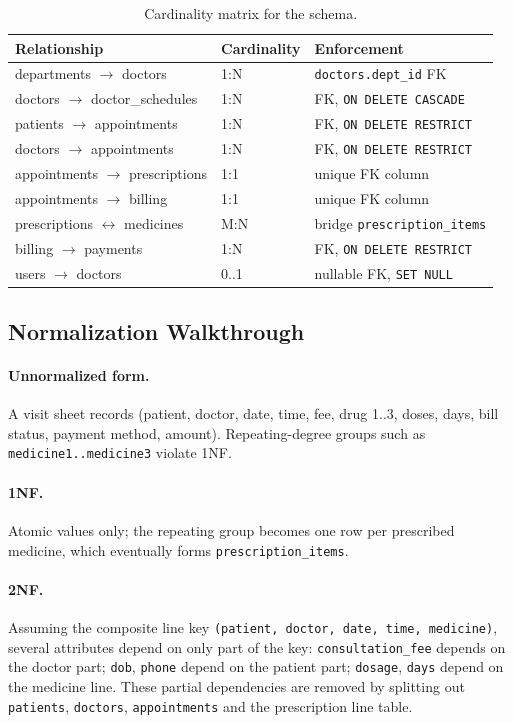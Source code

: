 \documentclass[11pt]{article}
\begin{document}
\begin{table}[h]\centering
\begin{tabular}{@{}lll@{}}
\toprule
Relationship & Cardinality & Enforcement \\
\midrule
departments $\rightarrow$ doctors & 1:N & \texttt{doctors.dept\_id} FK \\
doctors $\rightarrow$ doctor\_schedules & 1:N & FK, \texttt{ON DELETE CASCADE} \\
patients $\rightarrow$ appointments & 1:N & FK, \texttt{ON DELETE RESTRICT} \\
doctors $\rightarrow$ appointments & 1:N & FK, \texttt{ON DELETE RESTRICT} \\
appointments $\rightarrow$ prescriptions & 1:1 & unique FK column \\
appointments $\rightarrow$ billing & 1:1 & unique FK column \\
prescriptions $\leftrightarrow$ medicines & M:N & bridge \texttt{prescription\_items} \\
billing $\rightarrow$ payments & 1:N & FK, \texttt{ON DELETE RESTRICT} \\
users $\rightarrow$ doctors & 0..1 & nullable FK, \texttt{SET NULL} \\
\bottomrule
\end{tabular}
\caption{Cardinality matrix for the schema.}\label{fig:er}
\end{table}

\subsection{Normalization Walkthrough}

\paragraph{Unnormalized form.} A visit sheet records
(patient, doctor, date, time, fee, drug 1..3, doses, days, bill status,
payment method, amount). Repeating-degree groups such as
\texttt{medicine1..medicine3} violate 1NF.

\paragraph{1NF.} Atomic values only; the repeating group becomes one row per
prescribed medicine, which eventually forms \texttt{prescription\_items}.

\paragraph{2NF.} Assuming the composite line key
\texttt{(patient, doctor, date, time, medicine)}, several attributes depend on
only part of the key: \texttt{consultation\_fee} depends on the doctor part;
\texttt{dob}, \texttt{phone} depend on the patient part; \texttt{dosage},
\texttt{days} depend on the medicine line. These partial dependencies are
removed by splitting out \texttt{patients}, \texttt{doctors},
\texttt{appointments} and the prescription line table.
\end{document}
